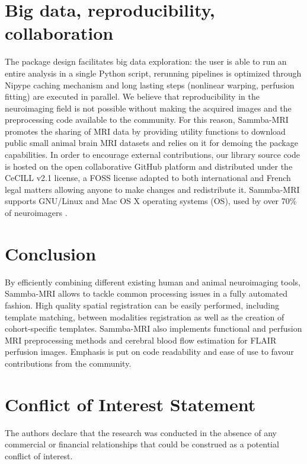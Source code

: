 \documentclass[utf8, a4paper, final, crop]{frontiersSCNS}
\begin{document}
\section{Big data, reproducibility, collaboration}
The package design facilitates big data exploration: the user is able to run an 
entire analysis in a single Python script, rerunning pipelines is optimized 
through Nipype caching mechanism and long lasting steps (nonlinear warping, perfusion 
fitting) are executed in parallel.
We believe that reproducibility in the neuroimaging field is not possible without
making the acquired images and the preprocessing code available to the community.
For this reason, Sammba-MRI promotes the sharing of MRI data by providing 
utility functions to download public small animal brain MRI 
datasets and relies on it for demoing the package capabilities.
In order to encourage external contributions, our library source code is hosted on the open 
collaborative GitHub platform
and distributed under the CeCILL v2.1 license, a FOSS license adapted to both international and French legal matters 
allowing anyone to make changes and redistribute it. 
Sammba-MRI supports GNU/Linux and Mac OS X operating systems (OS), used by over 70\% 
of neuroimagers \citep{hanke2011neuroscience}. 

\section{Conclusion}

By efficiently combining different existing human and animal neuroimaging
tools, Sammba-MRI allows to tackle common processing issues in a fully
automated fashion. High quality spatial registration can be easily performed, 
including template matching, between modalities registration as well as
the creation of cohort-specific templates. Sammba-MRI also implements
functional and perfusion MRI preprocessing methods and cerebral blood flow
estimation for FLAIR perfusion images. Emphasis is put on code readability
and ease of use to favour contributions from the community.

\section*{Conflict of Interest Statement}

The authors declare that the research was conducted in the absence
of any commercial or financial relationships that could be construed
as a potential conflict of interest.
\end{document}
